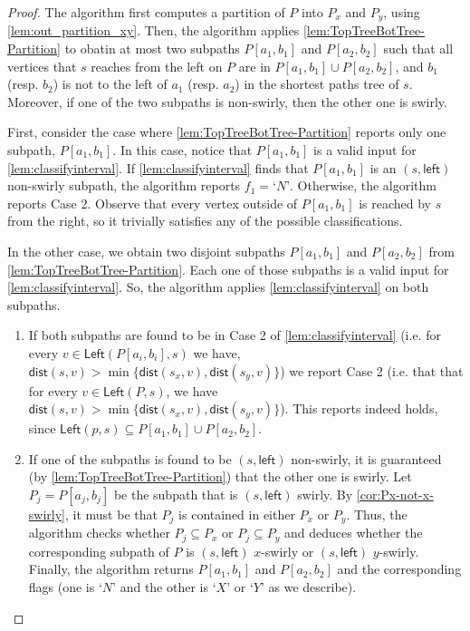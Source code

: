 \documentclass{article}
\newcommand{\Left}{\mathsf{Left}}
\newcommand{\leftside}{\mathsf{left}}
\newcommand{\dist}{\mathsf{dist}}
\begin{document}
\begin{proof}
    The algorithm first computes a partition of $P$ into $P_x$ and $P_y$, using \cref{lem:out_partition_xy}.
    Then, the algorithm applies \cref{lem:TopTreeBotTree-Partition} to obatin at most two subpaths $P[a_1,b_1]$ and $P[a_2,b_2]$ such that all vertices that $s$ reaches from the left on $P$ are in $P[a_1,b_1] \cup P[a_2,b_2]$, and $b_1$ (resp. $b_2$) is not to the left of $a_1$ (resp. $a_2$) in the shortest paths tree of $s$.
    Moreover, if one of the two subpaths is non-swirly, then the other one is swirly.

    First, consider the case where \cref{lem:TopTreeBotTree-Partition} reports only one subpath, $P[a_1,b_1]$.
    In this case, notice that $P[a_1,b_1]$ is a valid input for \cref{lem:classifyinterval}.
    If \cref{lem:classifyinterval} finds that $P[a_1,b_1]$ is an $(s,\leftside)$ non-swirly subpath, the algorithm reports $f_1=‘N’$. Otherwise, the algorithm reports Case 2.
    Observe that every vertex outside of $P[a_1,b_1]$ is reached by $s$ from the right, so it trivially satisfies any of the possible classifications.


    In the other case, we obtain two disjoint subpaths $P[a_1,b_1]$ and $P[a_2,b_2]$ from \cref{lem:TopTreeBotTree-Partition}.
    Each one of those subpaths is a valid input for \cref{lem:classifyinterval}.
    So, the algorithm applies \cref{lem:classifyinterval} on both subpaths.
    \begin{enumerate}
        \item
    If both subpaths are found to be in Case 2 of \cref{lem:classifyinterval} (i.e. for every $v\in \Left(P[a_i,b_i],s)$  we have, $\dist(s,v)>\min\{\dist(s_x,v),\dist(s_y,v)\}$) we report Case 2 (i.e. that that for every $v\in \Left(P,s)$, we have $\dist(s,v)>\min\{\dist(s_x,v),\dist(s_y,v)\}$).
    This reports indeed holds, since $\Left(p,s)\subseteq P[a_1,b_1]\cup P[a_2,b_2]$.

    \item If one of the subpaths is found to be $(s,\leftside)$ non-swirly, it is guaranteed (by \cref{lem:TopTreeBotTree-Partition}) that the other one is swirly.
    Let $P_j=P[a_j,b_j]$ be the subpath that is $(s,\leftside)$ swirly. By \cref{cor:Px-not-x-swirly}, it must be that $P_j$ is contained in either $P_x$ or $P_y$.
    Thus, the algorithm checks whether $P_j\subseteq P_x$ or $P_j\subseteq P_y$ and deduces whether the corresponding subpath of $P$ is $(s,\leftside)$ $x$-swirly or $(s,\leftside)$ $y$-swirly.
    Finally, the algorithm returns $P[a_1,b_1]$ and $P[a_2,b_2]$ and the corresponding flags (one is $‘N’$ and the other is $‘X’$ or $‘Y’$ as we describe).\qedhere
    \end{enumerate}
\end{proof}
\end{document}
